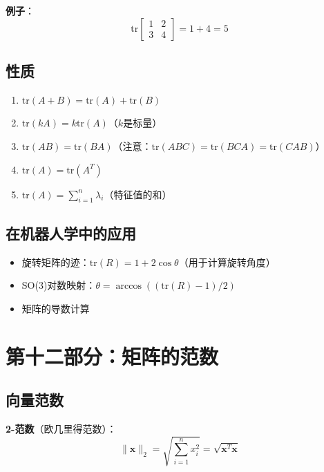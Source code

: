 \documentclass[12pt,a4paper]{article}
\begin{document}
\textbf{例子}：
\begin{equation}
\text{tr}\begin{bmatrix} 1 & 2 \\ 3 & 4 \end{bmatrix} = 1 + 4 = 5
\end{equation}

\subsection{性质}

\begin{enumerate}
\item $\text{tr}(A + B) = \text{tr}(A) + \text{tr}(B)$
\item $\text{tr}(kA) = k \text{tr}(A)$（$k$是标量）
\item $\text{tr}(AB) = \text{tr}(BA)$（注意：$\text{tr}(ABC) = \text{tr}(BCA) = \text{tr}(CAB)$）
\item $\text{tr}(A) = \text{tr}(A^T)$
\item $\text{tr}(A) = \sum_{i=1}^n \lambda_i$（特征值的和）
\end{enumerate}

\subsection{在机器人学中的应用}

\begin{itemize}
\item 旋转矩阵的迹：$\text{tr}(R) = 1 + 2\cos\theta$（用于计算旋转角度）
\item SO(3)对数映射：$\theta = \arccos((\text{tr}(R) - 1)/2)$
\item 矩阵的导数计算
\end{itemize}

\section{第十二部分：矩阵的范数}

\subsection{向量范数}

\textbf{2-范数}（欧几里得范数）：
\begin{equation}
\|\bm{x}\|_2 = \sqrt{\sum_{i=1}^n x_i^2} = \sqrt{\bm{x}^T \bm{x}}
\end{equation}
\end{document}
